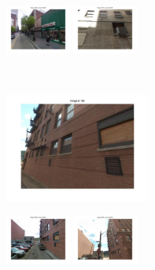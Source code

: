 \begin{figure}[h]
\begin{minipage}{0.75\linewidth}
\begin{minipage}{\linewidth}
                \colorbox{myRed}{\includegraphics[trim = 35mm 30mm 35mm 30mm, clip=true, height=16mm]{imgs/Pval/exImproved04/improved03.jpg}}
                \colorbox{myRed}{\includegraphics[trim = 35mm 30mm 35mm 30mm, clip=true, height=16mm]{imgs/Pval/exImproved04/improved04.jpg}}
            \end{minipage} 
        \end{minipage}
        \vspace{3mm}
        \\
        \begin{minipage}{0.34\linewidth}
            \centering
            \vspace{0mm}
            \includegraphics[trim = 45mm 40mm 45mm 30mm, clip=true, height=36mm]{imgs/Pval/exMix09/query.jpg}
        \end{minipage}
        \begin{minipage}{0.75\linewidth}
            \begin{minipage}{\linewidth} 
                \colorbox{myGreen}{\includegraphics[trim = 35mm 30mm 35mm 30mm, clip=true, height=16mm]{imgs/Pval/exMix09/mixPval01.jpg}}
                \colorbox{myGreen}{\includegraphics[trim = 35mm 30mm 35mm 30mm, clip=true, height=16mm]{imgs/Pval/exMix09/mixPval02.jpg}}

\end{minipage}
\end{minipage}
\end{figure}
